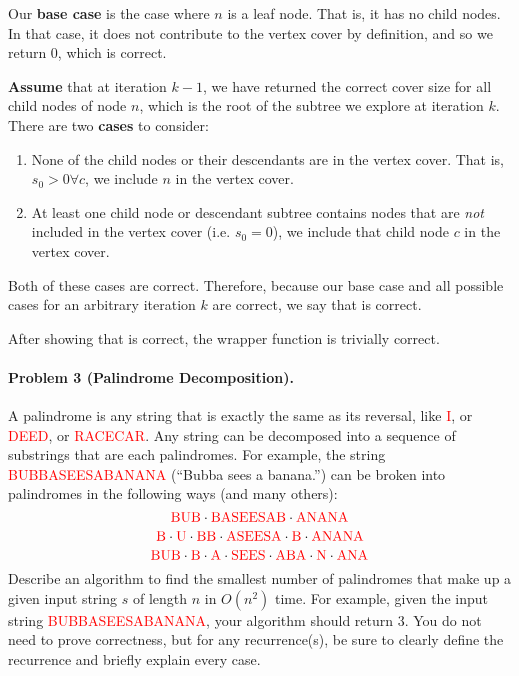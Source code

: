 \documentclass[11pt]{article}
\begin{document}
Our \textbf{base case} is the case where $n$ is a leaf node. That is, it has
no child nodes. In that case, it does not contribute to the vertex cover by
definition, and so we return 0, which is correct.

\textbf{Assume} that at iteration $k-1$, we have returned the correct cover
size for all child nodes of node $n$, which is the root of the subtree we 
explore at iteration $k$. There are two \textbf{cases} to consider:
\begin{enumerate}
    \item None of the child nodes or their descendants are in the vertex cover.
        That is, $s_{0} > 0 \forall c$, we include $n$ in the vertex cover.
    \item At least one child node or descendant subtree contains nodes that
        are \textit{not} included in the vertex cover (i.e. $s_{0} = 0$), we 
        include that child node $c$ in the vertex cover.
\end{enumerate}

Both of these cases are correct. Therefore, because our base case and all 
possible cases for an arbitrary iteration $k$ are correct, we say that
 is correct.

After showing that  is correct, the wrapper function
 is trivially correct.


\newpage
\paragraph{Problem 3 (Palindrome Decomposition).} A palindrome is any string that is exactly the same as its reversal, like \textcolor{red}{I}, or \textcolor{red}{DEED}, or \textcolor{red}{RACECAR}. Any string can be decomposed into a sequence of substrings that are each palindromes. For example, the string \textcolor{red}{BUBBASEESABANANA} (``Bubba sees a banana.'') can be broken into palindromes in the following ways (and many others):
$$\text{\textcolor{red}{BUB}} \cdot \text{\textcolor{red}{BASEESAB}} \cdot \text{\textcolor{red}{ANANA}}$$
$$\text{\textcolor{red}{B}} \cdot \text{\textcolor{red}{U}} \cdot \text{\textcolor{red}{BB}}\cdot \text{\textcolor{red}{ASEESA}} \cdot \text{\textcolor{red}{B}} \cdot \text{\textcolor{red}{ANANA}}$$
$$\text{\textcolor{red}{BUB}} \cdot \text{\textcolor{red}{B}} \cdot \text{\textcolor{red}{A}} \cdot \text{\textcolor{red}{SEES}} \cdot \text{\textcolor{red}{ABA}}\cdot \text{\textcolor{red}{N}} \cdot \text{\textcolor{red}{ANA}}$$
Describe an algorithm to find the smallest number of palindromes that make up a given input string $s$ of length $n$ in $O(n^2)$ time. For example, given the input string \textcolor{red}{BUBBASEESABANANA}, your algorithm should return 3. You do not need to prove correctness, but for any recurrence(s), be sure to clearly define the recurrence and briefly explain every case.
\end{document}
